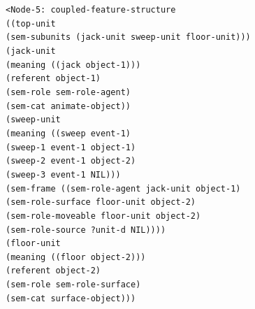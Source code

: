 {\footnotesize{\tt <Node-5: coupled-feature-structure
\\ ((top-unit
\\ \hspace*{5mm} (sem-subunits (jack-unit sweep-unit floor-unit)))
\\ \hspace*{2mm}(jack-unit
\\ \hspace*{5mm} (meaning ((jack object-1)))
\\ \hspace*{5mm} (referent object-1)
\\ \hspace*{5mm} (sem-role sem-role-agent)
\\ \hspace*{5mm} (sem-cat animate-object))
\\ \hspace*{2mm}(sweep-unit
\\ \hspace*{5mm} (meaning ((sweep event-1)
\\ \hspace*{27mm}(sweep-1 event-1 object-1)
\\ \hspace*{27mm}(sweep-2 event-1 object-2)
\\ \hspace*{27mm}(sweep-3 event-1 NIL)))
\\ \hspace*{5mm} (sem-frame ((sem-role-agent jack-unit object-1)
\\ \hspace*{30mm}(sem-role-surface floor-unit object-2)
\\ \hspace*{30mm}(sem-role-moveable floor-unit object-2)
\\ \hspace*{30mm}(sem-role-source ?unit-d NIL))))
\\ \hspace*{2mm}(floor-unit
\\ \hspace*{5mm} (meaning ((floor object-2)))
\\ \hspace*{5mm} (referent object-2)
\\ \hspace*{5mm} (sem-role sem-role-surface)
\\ \hspace*{5mm} (sem-cat surface-object)))
}}
